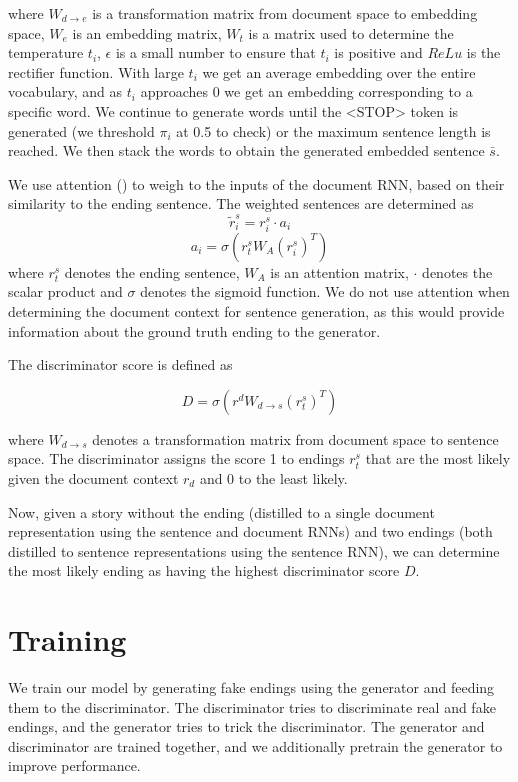 \documentclass{article}
\begin{document}
where $W_{d \rightarrow e}$ is a transformation matrix from document space to embedding space, $W_{e}$ is an embedding matrix, $W_{t}$ is a matrix used to determine the temperature $t_{i}$, $\epsilon$ is a small number to ensure that $t_{i}$ is positive and $ReLu$ is the rectifier function. With large $t_{i}$ we get an average embedding over the entire vocabulary, and as $t_{i}$ approaches 0 we get an embedding corresponding to a specific word. We continue to generate words until the <STOP> token is generated (we threshold $\pi_{i}$ at 0.5 to check) or the maximum sentence length is reached. We then stack the words to obtain the generated embedded sentence $\bar{s}$.

We use attention (\cite{P16-1122}) to weigh to the inputs of the document RNN, based on their similarity to the ending sentence. The weighted sentences are determined as
$$ \tilde{r}^{s}_{i} = r^{s}_{i} \cdot a_{i} $$
$$ a_{i} = \sigma(r^{s}_{t}W_{A}(r^{s}_{i})^{T}) $$
where $r^{s}_{t}$ denotes the ending sentence, $W_{A}$ is an attention matrix, $\cdot$ denotes the scalar product and $\sigma$ denotes the sigmoid function. We do not use attention when determining the document context for sentence generation, as this would provide information about the ground truth ending to the generator.

The discriminator score is defined as 

$$ D = \sigma(r^{d}W_{d \rightarrow s}(r^{s}_{t})^{T} )$$

where $W_{d \rightarrow s}$ denotes a transformation matrix from document space to sentence space. The discriminator assigns the score 1 to endings $r^{s}_{t}$ that are the most likely given the document context $r_{d}$ and 0 to the least likely.

Now, given a story without the ending (distilled to a single document representation using the sentence and document RNNs) and two endings (both distilled to sentence representations using the sentence RNN), we can determine the most likely ending as having the highest discriminator score $D$. 
\section{Training}
We train our model by generating fake endings using the generator and feeding them to the discriminator. The discriminator tries to discriminate real and fake endings, and the generator tries to trick the discriminator. The generator and discriminator are trained together, and we additionally pretrain the generator to improve performance.
\end{document}
